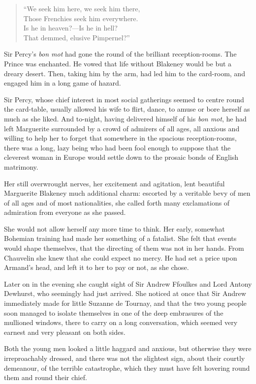 \documentclass[paper=5.5in:8.5in,BCOR=7mm,twoside,DIV=calc,12pt,usegeometry,chapterprefix,endperiod,headings=big]{scrbook}
\begin{document}
\blockquote{
\enquote{We seek him here, we seek him there,\\
Those Frenchies seek him everywhere.\\
Is he in heaven?---Is he in hell?\\
That demmed, elusive Pimpernel?}
}

Sir Percy's \textit{bon mot} had gone the round of the brilliant reception-rooms. The Prince was enchanted. He vowed that life without Blakeney would be but a dreary desert. Then, taking him by the arm, had led him to the card-room, and engaged him in a long game of hazard.

Sir Percy, whose chief interest in most social gatherings seemed to centre round the card-table, usually allowed his wife to flirt, dance, to amuse or bore herself as much as she liked. And to-night, having delivered himself of his \textit{bon mot}, he had left Marguerite surrounded by a crowd of admirers of all ages, all anxious and willing to help her to forget that somewhere in the spacious reception-rooms, there was a long, lazy being who had been fool enough to suppose that the cleverest woman in Europe would settle down to the prosaic bonds of English matrimony.

Her still overwrought nerves, her excitement and agitation, lent beautiful Marguerite Blakeney much additional charm: escorted by a veritable bevy of men of all ages and of most nationalities, she called forth many exclamations of admiration from everyone as she passed.

She would not allow herself any more time to think. Her early, somewhat Bohemian training had made her something of a fatalist. She felt that events would shape themselves, that the directing of them was not in her hands. From Chauvelin she knew that she could expect no mercy. He had set a price upon Armand's head, and left it to her to pay or not, as she chose.

Later on in the evening she caught sight of Sir Andrew Ffoulkes and Lord Antony Dewhurst, who seemingly had just arrived. She noticed at once that Sir Andrew immediately made for little Suzanne de Tournay, and that the two young people soon managed to isolate themselves in one of the deep embrasures of the mullioned windows, there to carry on a long conversation, which seemed very earnest and very pleasant on both sides.

Both the young men looked a little haggard and anxious, but otherwise they were irreproachably dressed, and there was not the slightest sign, about their courtly demeanour, of the terrible catastrophe, which they must have felt hovering round them and round their chief.
\end{document}
